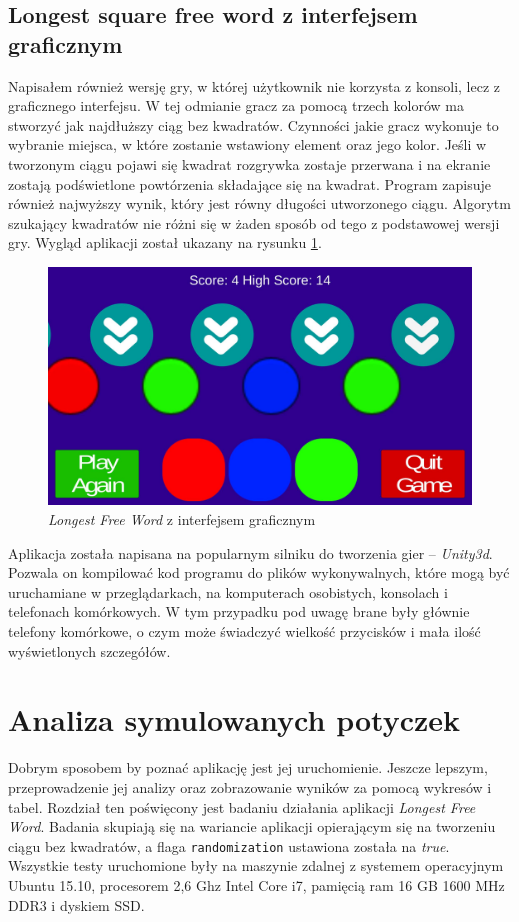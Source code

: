 \documentclass[document]{xmgr}
\begin{document}
\section{Longest square free word z interfejsem graficznym}
Napisałem również wersję gry, w której użytkownik nie korzysta z konsoli, lecz z graficznego interfejsu. W tej odmianie gracz za pomocą trzech kolorów ma stworzyć jak najdłuższy ciąg bez kwadratów. Czynności jakie gracz wykonuje to wybranie miejsca, w które zostanie wstawiony element oraz jego kolor. Jeśli w tworzonym ciągu pojawi się kwadrat rozgrywka zostaje przerwana i na ekranie zostają podświetlone powtórzenia składające się na kwadrat. Program zapisuje również najwyższy wynik, który jest równy długości utworzonego ciągu. Algorytm szukający kwadratów nie różni się w żaden sposób od tego z podstawowej wersji gry. Wygląd aplikacji został ukazany na rysunku \ref{fig:thueMobile}.

\begin{figure}[tbh]
    \centering
    \includegraphics[width = \textwidth]{images/thueMobile}
    \caption{\emph{Longest Free Word} z interfejsem graficznym}
    \label{fig:thueMobile}
\end{figure}

Aplikacja została napisana na popularnym silniku do tworzenia gier -- \emph{Unity3d}. Pozwala on kompilować kod programu do plików wykonywalnych, które mogą być uruchamiane w przeglądarkach, na komputerach osobistych, konsolach i telefonach komórkowych. W tym przypadku pod uwagę brane były głównie telefony komórkowe, o czym może świadczyć wielkość przycisków i mała ilość wyświetlonych szczegółów.


\chapter{Analiza symulowanych potyczek} 
Dobrym sposobem by poznać aplikację jest jej uruchomienie. Jeszcze lepszym, przeprowadzenie jej analizy oraz zobrazowanie wyników za pomocą wykresów i tabel. Rozdział ten poświęcony jest badaniu działania aplikacji \emph{Longest Free Word}. Badania skupiają się na wariancie aplikacji opierającym się na tworzeniu ciągu bez kwadratów, a flaga \texttt{randomization} ustawiona została na \textit{true}. Wszystkie testy uruchomione były na maszynie zdalnej z systemem operacyjnym Ubuntu 15.10, procesorem 2,6 Ghz Intel Core i7, pamięcią ram 16 GB 1600 MHz DDR3 i dyskiem SSD.
\end{document}
